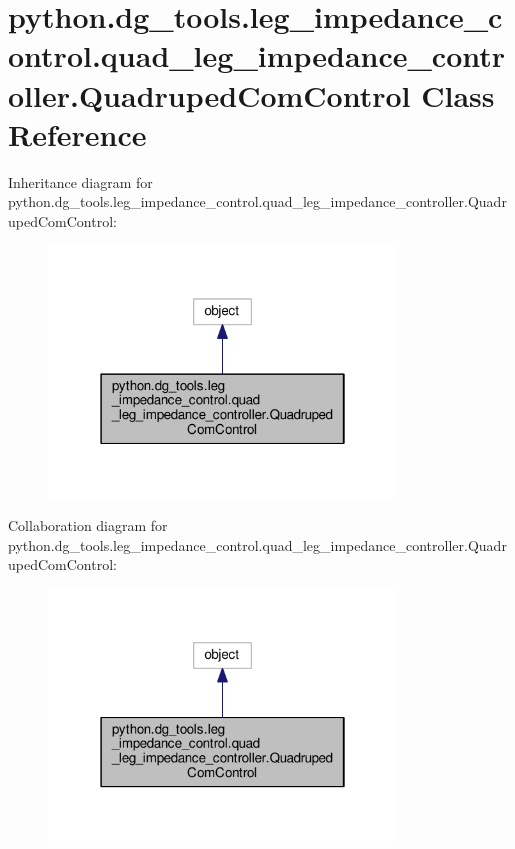 \hypertarget{classpython_1_1dg__tools_1_1leg__impedance__control_1_1quad__leg__impedance__controller_1_1QuadrupedComControl}{}\section{python.\+dg\+\_\+tools.\+leg\+\_\+impedance\+\_\+control.\+quad\+\_\+leg\+\_\+impedance\+\_\+controller.\+Quadruped\+Com\+Control Class Reference}
\label{classpython_1_1dg__tools_1_1leg__impedance__control_1_1quad__leg__impedance__controller_1_1QuadrupedComControl}


Inheritance diagram for python.\+dg\+\_\+tools.\+leg\+\_\+impedance\+\_\+control.\+quad\+\_\+leg\+\_\+impedance\+\_\+controller.\+Quadruped\+Com\+Control\+:
\nopagebreak
\begin{figure}[H]
\begin{center}
\leavevmode
\includegraphics[width=262pt]{classpython_1_1dg__tools_1_1leg__impedance__control_1_1quad__leg__impedance__controller_1_1QuadrupedComControl__inherit__graph}
\end{center}
\end{figure}


Collaboration diagram for python.\+dg\+\_\+tools.\+leg\+\_\+impedance\+\_\+control.\+quad\+\_\+leg\+\_\+impedance\+\_\+controller.\+Quadruped\+Com\+Control\+:
\nopagebreak
\begin{figure}[H]
\begin{center}
\leavevmode
\includegraphics[width=262pt]{classpython_1_1dg__tools_1_1leg__impedance__control_1_1quad__leg__impedance__controller_1_1QuadrupedComControl__coll__graph}
\end{center}
\end{figure}
